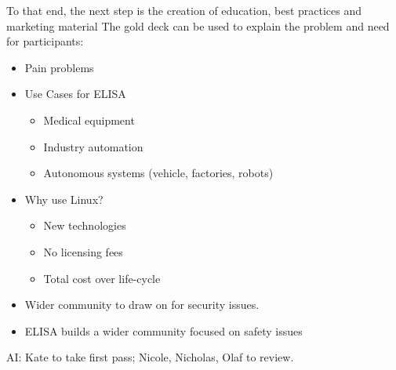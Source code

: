 \documentclass[12pt]{../Common_files/ElisaPaper}
\begin{document}
To that end, the next step is the creation of education, best practices and marketing material
The gold deck can be used to explain the problem and need for participants:
\begin{itemize}
	\item Pain problems
	\item Use Cases for ELISA
		\begin{itemize}
			\item Medical equipment
			\item Industry automation
			\item Autonomous systems (vehicle, factories, robots)
		\end{itemize}
	\item Why use Linux?
		\begin{itemize}
			\item New technologies
			\item No licensing fees
			\item Total cost over life-cycle
		\end{itemize}
	\item Wider community to draw on for security issues.
	\item ELISA builds a wider community focused on safety issues
\end{itemize}
AI:  Kate to take first pass; Nicole, Nicholas, Olaf to review.
\end{document}
